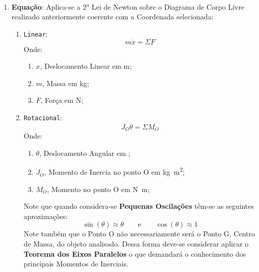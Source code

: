 \documentclass{article}
\begin{document}
\begin{enumerate}[rightmargin = \leftmargin]
        \item \textbf{Equação}: Aplica-se a 2\textsuperscript{a} Lei de Newton sobre o Diagrama de Corpo Livre realizado anteriormente coerente com a Coordenada selecionada:
        \begin{enumerate}[rightmargin = \leftmargin, noitemsep]
            \item \texttt{Linear}:
            \begin{equation}
                m \ddot{x} = \Sigma F
            \end{equation}\noindent
            Onde:
            \begin{enumerate}[rightmargin = \leftmargin, noitemsep]
                \item $x$, Deslocamento Linear em \unit{\meter};
                \item $m$, Massa em \unit{\kilogram};
                \item $F$, Força em \unit{\newton};
            \end{enumerate}
            \item \texttt{Rotacional}:
            \begin{equation}
                J_O \ddot{\theta} = \Sigma M_O
            \end{equation}\noindent
            Onde:
            \begin{enumerate}[rightmargin = \leftmargin, noitemsep]
                \item $\theta$, Deslocamento Angular em \unit{\rad};
                \item $J_O$, Momento de Inercia no ponto O em \unit{\kilogram\square\meter};
                \item $M_O$, Momento no ponto O em \unit{\newton\meter};
            \end{enumerate}\noindent
            Note que quando considera-se \textbf{Pequenas Oscilações} têm-se as seguintes aproximações:
            \begin{equation}
                \sin(\theta) \approx \theta
                \qquad \text{e} \qquad
                \cos(\theta) \approx 1
            \end{equation}\noindent
            Note também que o Ponto O não necessariamente será o Ponto G, Centro de Massa, do objeto analisado. Dessa forma deve-se considerar aplicar o \textbf{Teorema dos Eixos Paralelos} o que demandará o conhecimento dos principais Momentos de Inerciais.\\
            

\end{enumerate}
\end{enumerate}
\end{document}
